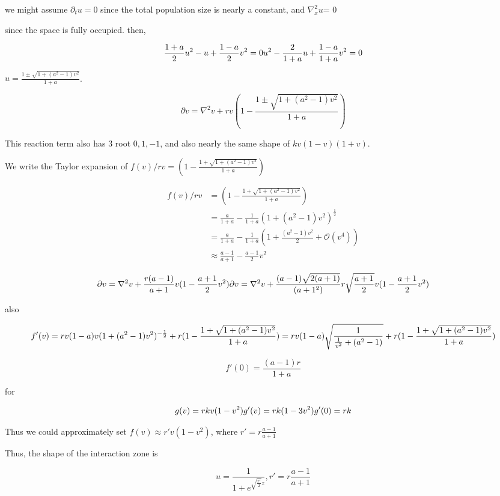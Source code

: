 \documentclass[
]{article}
\begin{document}
we might assume $\partial_t u = 0$ since the total population size is
nearly a constant, and $\nabla^2_x u$= 0

since the space is fully occupied. then,

\begin{equation*}
\frac{1+a}{2}u^2 - u + \frac{1-a}{2}v^2 = 0\\
u^2 - \frac{2}{1+a}u + \frac{1-a}{1+a}v^2 = 0
\end{equation*}

$u = \frac{1\pm\sqrt{1+(a^2-1)v^2}}{1+a}$.

\begin{equation*}
\partial v = \nabla^2 v + r v (1 - \frac{1\pm\sqrt{1+(a^2-1)v^2}}{1+a})
\end{equation*}

This reaction term also has $3$ root $0,1,-1$, and also nearly the
same shape of $kv(1-v)(1+v)$.

We write the Taylor expansion of
$f(v)/rv = (1 - \frac{1+\sqrt{1+(a^2-1)v^2}}{1+a})$

\begin{align*}
f(v)/rv &= (1 - \frac{1+\sqrt{1+(a^2-1)v^2}}{1+a})\\
&= \frac{a}{1+a} - \frac{1}{1+a} (1+(a^2-1)v^2)^{\frac{1}{2}}\\
&= \frac{a}{1+a} - \frac{1}{1+a} (1+\frac{(a^2-1)v^2}{2} + \mathcal{O}(v^4))\\
&\approx \frac{a-1}{a+1}-\frac{a-1}{2}v^2
\end{align*}


\begin{equation*}
\partial v = \nabla^2 v + \frac{r(a-1)}{a+1} v (1-\frac{a+1}{2}v^2)\\
\partial v = \nabla^2 v + \frac{(a-1)\sqrt{2(a+1)}}{(a+1^2)}r \sqrt{\frac{a+1}{2}}v (1-\frac{a+1}{2}v^2)
\end{equation*}

also

\begin{equation*}
f'(v) = rv(1-a)v (1+(a^2-1)v^2)^{-\frac{1}{2}}+r(1 - \frac{1+\sqrt{1+(a^2-1)v^2}}{1+a})\\
=rv(1-a)\sqrt{\frac{1}{\frac{1}{v^2}+(a^2-1)}}+r(1 - \frac{1+\sqrt{1+(a^2-1)v^2}}{1+a})
\end{equation*}

\begin{equation*}
f'(0) = \frac{(a-1)r}{1+a}
\end{equation*}

for

\begin{equation*}
g(v) = rkv(1-v^2)\\
g'(v) = rk(1-3v^2)\\
g'(0) = rk
\end{equation*}

Thus we could approximately set $f(v)\approx r'v(1-v^2)$, where
$r' = r\frac{a-1}{a+1}$

Thus, the shape of the interaction zone is

\begin{equation*}
u = \frac{1}{1+e^{\sqrt{\frac{r'}{2}}z}},r' = r\frac{a-1}{a+1}
\end{equation*}
\end{document}
